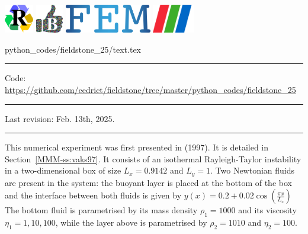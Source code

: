 \noindent
\includegraphics[height=1.25cm]{images/pictograms/replication}
\includegraphics[height=1.25cm]{images/pictograms/benchmark}
\includegraphics[height=1.25cm]{images/pictograms/FEM}
\includegraphics[height=1.25cm]{images/pictograms/paraview}


\begin{flushright} {\tiny {\color{gray} python\_codes/fieldstone\_25/text.tex}} \end{flushright}

\par\noindent\rule{\textwidth}{0.4pt}

\begin{center}
\inpython
{\small Code: \url{https://github.com/cedrict/fieldstone/tree/master/python_codes/fieldstone_25}}
\end{center}

\par\noindent\rule{\textwidth}{0.4pt}

Last revision: Feb. 13th, 2025.

\par\noindent\rule{\textwidth}{0.4pt}


This numerical experiment was first presented in \textcite{vaks97} (1997).
It is detailed in Section~\ref{MMM-ss:vaks97}.
It consists of an isothermal Rayleigh-Taylor instability in a two-dimensional box
of size $L_x=0.9142$ and $L_y=1$.
Two Newtonian fluids are present in the system: the buoyant layer is placed at the bottom of 
the box and the interface between both fluids is given by 
$
y(x)=0.2+0.02\cos \left( \frac{\pi x}{L_x}  \right)
$
The bottom fluid is parametrised by its mass density $\rho_1=1000$ and its viscosity $\eta_1=1,10,100$, 
while the layer above is parametrised by $\rho_2=1010$ and $\eta_2=100$.

